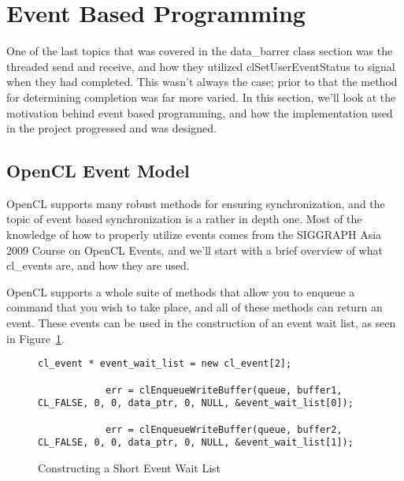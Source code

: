 \documentclass[../thesis.tex]{subfiles}
\begin{document}
\section{Event Based Programming} %
\label{sec:event_based_programming}
    One of the last topics that was covered in the data\_barrer class section was the threaded send and receive, and how they utilized clSetUserEventStatus to signal when they had completed. This wasn't always the case; prior to that the method for determining completion was far more varied. In this section, we'll look at the motivation behind event based programming, and how the implementation used in the project progressed and was designed.

    \subsection{OpenCL Event Model} %
    \label{sub:opencl_event_model}
        OpenCL supports many robust methods for ensuring synchronization, and the topic of event based synchronization is a rather in depth one. Most of the knowledge of how to properly utilize events comes from the SIGGRAPH Asia 2009 Course on OpenCL Events\cite{advancedopenclevent}, and we'll start with a brief overview of what cl\_events are, and how they are used.

        OpenCL supports a whole suite of methods that allow you to enqueue a command that you wish to take place, and all of these methods can return an event. These events can be used in the construction of an event wait list, as seen in Figure~\ref{fig:event_wait_list_construction}.

        \begin{figure}[htbp]
            \centering

            \lstset{language=cpp}  
            \begin{lstlisting}[tabsize=2]
            cl_event * event_wait_list = new cl_event[2];

            err = clEnqueueWriteBuffer(queue, buffer1, CL_FALSE, 0, 0, data_ptr, 0, NULL, &event_wait_list[0]);

            err = clEnqueueWriteBuffer(queue, buffer2, CL_FALSE, 0, 0, data_ptr, 0, NULL, &event_wait_list[1]);
            \end{lstlisting}
            \caption{Constructing a Short Event Wait List}
            \label{fig:event_wait_list_construction}
        \end{figure}
\end{document}

